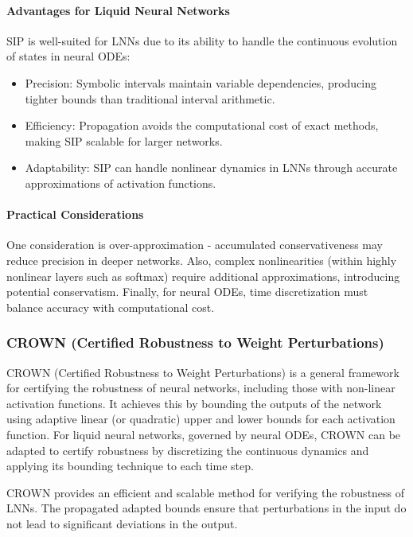 \paragraph{Advantages for Liquid Neural Networks}
SIP is well-suited for LNNs due to its ability to handle the continuous evolution of states in neural ODEs:
\begin{itemize}
    \item Precision: Symbolic intervals maintain variable dependencies, producing tighter bounds than traditional interval arithmetic.
    \item Efficiency: Propagation avoids the computational cost of exact methods, making SIP scalable for larger networks.
    \item Adaptability: SIP can handle nonlinear dynamics in LNNs through accurate approximations of activation functions.
\end{itemize}

\paragraph{Practical Considerations}
One consideration is over-approximation - accumulated conservativeness may reduce precision in deeper networks. Also, complex nonlinearities (within highly nonlinear layers such as softmax) require additional approximations, introducing potential conservatism. Finally, for neural ODEs, time discretization must balance accuracy with computational cost.

\subsubsection{CROWN (Certified Robustness to Weight Perturbations)}

CROWN (Certified Robustness to Weight Perturbations) is a general framework for certifying the robustness of neural networks, including those with non-linear activation functions. It achieves this by bounding the outputs of the network using adaptive linear (or quadratic) upper and lower bounds for each activation function. For liquid neural networks, governed by neural ODEs, CROWN can be adapted to certify robustness by discretizing the continuous dynamics and applying its bounding technique to each time step.

CROWN provides an efficient and scalable method for verifying the robustness of LNNs. The propagated adapted bounds ensure that perturbations in the input do not lead to significant deviations in the output.

